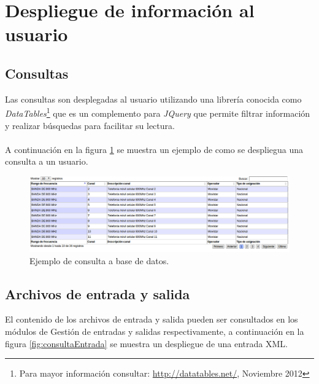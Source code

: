 \section{Despliegue de información al usuario}

\subsection{Consultas}

Las consultas son desplegadas al usuario utilizando una librería conocida como \textit{DataTables}\footnote{Para mayor información consultar: \url{http://datatables.net/}, Noviembre 2012} que es un complemento para \textit{JQuery} que permite filtrar información y realizar búsquedas para facilitar su lectura.
\\\\
A continuación en la figura \ref{fig:consultaUsuario} se muestra un ejemplo de como se despliegua una consulta a un usuario.

\begin{figure}[H]
	\centering
	\includegraphics[width=15cm]{Capitulo8InterfacesWeb/Imagenes/ConsultaUsuario.png}
	\caption{Ejemplo de consulta a base de datos.}
	\label{fig:consultaUsuario}	
\end{figure}


\subsection{Archivos de entrada y salida}

El contenido de los archivos de entrada y salida pueden ser consultados en los módulos de Gestión de entradas y salidas respectivamente, a continuación en la figura \ref{fig:consultaEntrada} se muestra un despliegue de una entrada XML.

